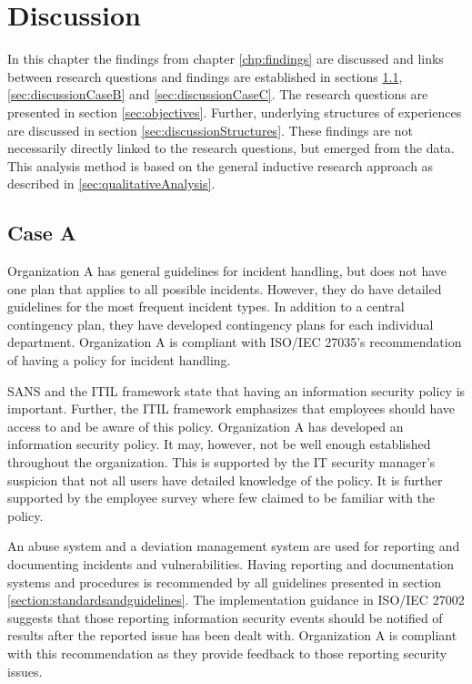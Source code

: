 \chapter{Discussion}
\label{chp:discussion}
In this chapter the findings from chapter \ref{chp:findings} are discussed and links between research questions and findings are established in sections \ref{sec:discussionCaseA}, \ref{sec:discussionCaseB} and \ref{sec:discussionCaseC}. The research questions are presented in section \ref{sec:objectives}. Further, underlying structures of experiences  are discussed in section \ref{sec:discussionStructures}. These findings are not necessarily  directly linked to the research questions, but emerged from the data. This analysis method is based on the general inductive research approach as described in \ref{sec:qualitativeAnalysis}.  

\section{Case A}
\label{sec:discussionCaseA}
Organization A has general guidelines for incident handling, but does not have one plan that applies to all possible incidents. However, they do have detailed guidelines for the most frequent incident types. In addition to a central contingency plan, they have developed contingency plans for each individual department. Organization A is compliant with ISO/IEC 27035's recommendation of having a policy for incident handling.

SANS and the \acs{ITIL} framework state that having an information security policy is important. Further, the \acs{ITIL} framework emphasizes that employees should have access to and be aware of this policy. Organization A has developed an information security policy. It may, however, not be well enough established throughout the organization. This is supported by the IT security manager's suspicion that not all users have detailed knowledge of the policy. It is further supported by the employee survey where few claimed to be familiar with the policy.

An abuse system and a deviation management system are used for reporting and documenting incidents and vulnerabilities. Having reporting and documentation systems and procedures is recommended by all guidelines presented in section \ref{section:standardsandguidelines}.   The implementation guidance in ISO/IEC 27002 suggests that those reporting information security events should be notified of results after the reported issue has been dealt with. Organization A is compliant with this recommendation as they provide feedback to those reporting security issues. 

